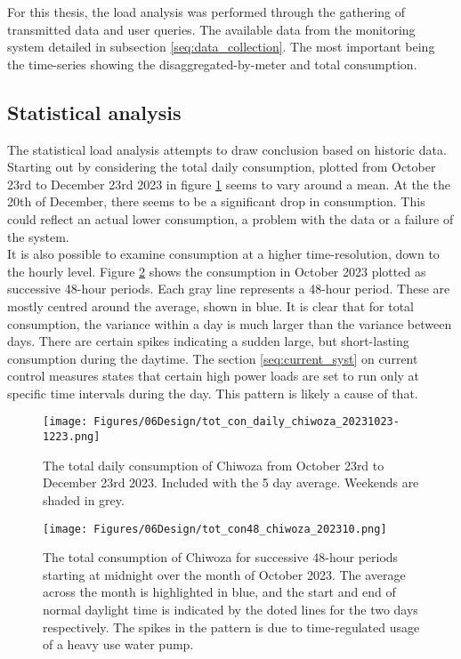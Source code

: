 For this thesis, the load analysis was performed through the gathering of transmitted data and user queries. The available data from the monitoring system detailed in subsection \ref{seq:data_collection}. The most important being the time-series showing the disaggregated-by-meter and total consumption.\\

\subsection{Statistical analysis}

The statistical load analysis attempts to draw conclusion based on historic data. Starting out by considering the total daily consumption, plotted from October 23rd to December 23rd 2023 in figure \ref{fig:tot_con_daily_chiwoza_20231023-1223}  seems to vary around a mean. At the the 20th of December, there seems to be a significant drop in consumption. This could reflect an actual lower consumption, a problem with the data or a failure of the system.\\ 

It is also possible to examine consumption at a higher time-resolution, down to the hourly level. Figure \ref{fig:tot_con48_chiwoza_202310} shows the consumption in October 2023 plotted as successive 48-hour periods. Each gray line represents a 48-hour period. These are mostly centred around the average, shown in blue. It is clear that for total consumption, the variance within a day is much larger than the variance between days. There are certain spikes indicating a sudden large, but short-lasting consumption during the daytime. The section \ref{seq:current_syst} on current control measures states that certain high power loads are set to run only at specific time intervals during the day. This pattern is likely a cause of that.\\

\begin{figure}
    \centering
    \texttt{[image: Figures/06Design/tot\_con\_daily\_chiwoza\_20231023-1223.png]}
    \caption[Daily consumption Chiwoza 20231023-1223]{The total daily consumption of Chiwoza from October 23rd to December 23rd 2023. Included with the 5 day average. Weekends are shaded in grey.}
    \label{fig:tot_con_daily_chiwoza_20231023-1223}
\end{figure}

\begin{figure}
    \centering
    \texttt{[image: Figures/06Design/tot\_con48\_chiwoza\_202310.png]}
    \caption[Consumption Chiwoza October successive 48h-periods]{The total consumption of Chiwoza for successive 48-hour periods starting at midnight over the month of October 2023. The average across the month is highlighted in blue, and the start and end of normal daylight time is indicated by the doted lines for the two days respectively. The spikes in the pattern is due to time-regulated usage of a heavy use water pump.}
    \label{fig:tot_con48_chiwoza_202310}
\end{figure}

